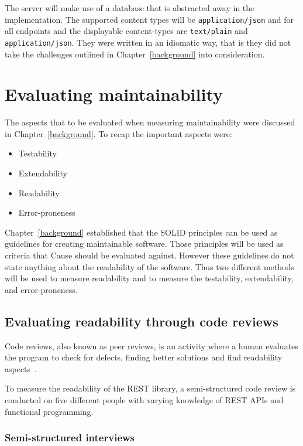 The server will make use of a database that is abstracted away in the
implementation. The supported content types will be \texttt{application/json}
and for all endpoints and the displayable content-types are \texttt{text/plain}
and \texttt{application/json}.  They were written in an idiomatic way, that is
they did not take the challenges outlined in Chapter~\ref{background} into
consideration.

\section{Evaluating maintainability}\label{evaluatingmaintainability}

The aspects that to be evaluated when measuring maintainability were discussed
in Chapter~\ref{background}. To recap the important aspects were:

\begin{itemize}
    \item Testability
    \item Extendability
    \item Readability
    \item Error-proneness
\end{itemize}

Chapter~\ref{background} established that the SOLID principles can be used as
guidelines for creating maintainable software. Those principles will be used as
criteria that Cause should be evaluated against.  However these guidelines do
not state anything about the readability of the software.  Thus two different
methods will be used to measure readability and to measure the testability,
extendability, and error-proneness.

\subsection{Evaluating readability through code reviews}

Code reviews, also known as peer reviews, is an activity where a human evaluates
the program to check for defects, finding better solutions and find readability
aspects~\cite{bosu2015characteristics}.

To measure the readability of the REST library, a semi-structured code review is
conducted on five different people with varying knowledge of REST APIs and
functional programming.

\subsubsection{Semi-structured interviews}

